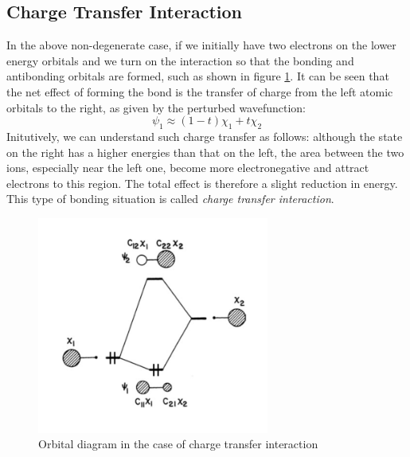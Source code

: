 \documentclass{article}
\begin{document}
\subsection{Charge Transfer Interaction}
In the above non-degenerate case, if we initially have two electrons on 
the lower energy orbitals and we turn on the interaction so that the bonding 
and antibonding orbitals are formed, such as shown in figure \ref{F:charge_transfer}. 
It can be seen that the net effect of forming the bond is the transfer of charge 
from the left atomic orbitals to the right, as given by the perturbed wavefunction:
\begin{equation*}
    \psi_1 \approx (1-t) \chi_1 + t \chi_2
\end{equation*}
Initutively, we can understand such charge transfer as follows: although the 
state on the right has a higher energies than that on the left, the area between 
the two ions, especially near the left one, become more electronegative and attract 
electrons to this region. The total effect is therefore a slight reduction in 
energy. This type of bonding situation is called \emph{charge transfer interaction}.
\begin{figure}[h!]
    \centering
    \includegraphics[width=3in]{F_charge_transfer.png}
    \caption{Orbital diagram in the case of charge transfer interaction}
    \label{F:charge_transfer}
\end{figure}
\end{document}
